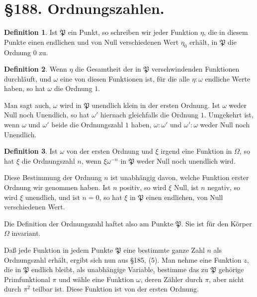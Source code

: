 \documentclass[12pt,a4paper]{article}
\theoremstyle{definition}
\newtheorem{defin}{Definition}[section]
\begin{document}
\newpage
\section*{\S 188. Ordnungszahlen.}

\begin{defin}
Ist $\mathfrak{P}$ ein Punkt, so schreiben wir jeder Funktion $\eta$, die in diesem Punkte einen endlichen und von Null verschiedenen Wert $\eta_0$ erhält, in $\mathfrak{P}$ die Ordnung $0$ zu.
\end{defin}

\begin{defin}
Wenn $\eta$ die Gesamtheit der in $\mathfrak{P}$ verschwindenden Funktionen durchläuft, und $\omega$ eine von diesen Funktionen ist, für die alle $\eta:\omega$ endliche Werte haben, so hat $\omega$ die Ordnung $1$.
\end{defin}

Man sagt auch, $\omega$ wird in $\mathfrak{P}$ unendlich klein in der ersten Ordnung. Ist $\omega$ weder Null noch Unendlich, so hat $\omega'$ hiernach gleichfalls die Ordnung $1$. Umgekehrt ist, wenn $\omega$ und $\omega'$ beide die Ordnungszahl $1$ haben, $\omega:\omega'$ und $\omega':\omega$ weder Null noch Unendlich.

\begin{defin}
Ist $\omega$ von der ersten Ordnung und $\xi$ irgend eine Funktion in $\Omega$, so hat $\xi$ die Ordnungszahl $n$, wenn $\xi\omega^{-n}$ in $\mathfrak{P}$ weder Null noch unendlich wird.
\end{defin}

Diese Bestimmung der Ordnung $n$ ist unabhängig davon, welche Funktion erster Ordnung wir genommen haben. Ist $n$ positiv, so wird $\xi$ Null, ist $n$ negativ, so wird $\xi$ unendlich, und ist $n = 0$, so hat $\xi$ in $\mathfrak{P}$ einen endlichen, von Null verschiedenen Wert.

Die Definition der Ordnungszahl haftet also am Punkte $\mathfrak{P}$. Sie ist für den Körper $\Omega$ invariant.

Daß jede Funktion in jedem Punkte $\mathfrak{P}$ eine bestimmte ganze Zahl $n$ als Ordnungszahl erhält, ergibt sich nun aus \S 185, (5). Man nehme eine Funktion $z$, die in $\mathfrak{P}$ endlich bleibt, als unabhängige Variable, bestimme das zu $\mathfrak{P}$ gehörige Primfunktional $\pi$ und wähle eine Funktion $\omega$, deren Zähler durch $\pi$, aber nicht durch $\pi^2$ teilbar ist. Diese Funktion ist von der ersten Ordnung.
\end{document}

